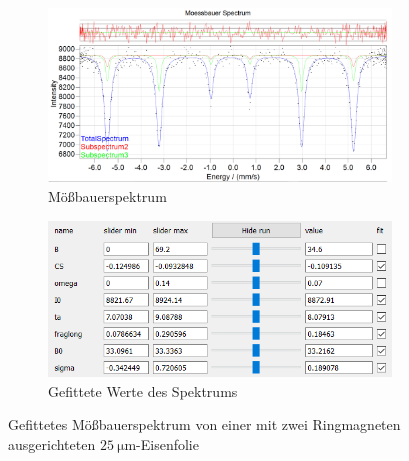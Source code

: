 \documentclass[german, %
parskip=full, %
bibliography=totoc, %
]{scrartcl}
\begin{document}
\begin{figure}[ht]
	\centering
	\begin{subfigure}[b]{0.5\textwidth}
		\includegraphics[width=\textwidth]{MoessbauerEisen25MagnetRing}
	  \caption{Mößbauerspektrum}
	  \label{fig:moess25ring}
  \end{subfigure}
  \begin{subfigure}[b]{0.4\textwidth}
	  \includegraphics[width=\textwidth]{WerteEisen25MagnetRing}
	  \caption{Gefittete Werte des Spektrums}
	  \label{fig:werte25ring}
  \end{subfigure}
	\caption{Gefittetes Mößbauerspektrum von einer mit zwei Ringmagneten ausgerichteten \(\SI{25}{\micro\meter}\)-Eisenfolie}
	\label{fig:magnetring}
\end{figure}
\end{document}
